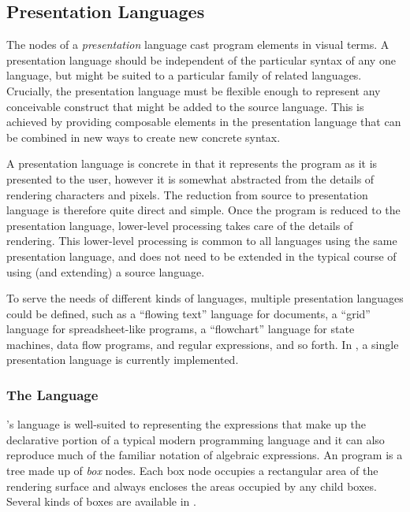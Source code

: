 %
%

\subsection{Presentation Languages}
The nodes of a \emph{presentation} language cast program elements in visual terms. A presentation language should be independent of the particular syntax of any one language, but might be suited to a particular family of related languages. Crucially, the presentation language must be flexible enough to represent any conceivable construct that might be added to the source language. This is achieved by providing composable elements in the presentation language that can be combined in new ways to create new concrete syntax.

A presentation language is concrete in that it represents the program as it is presented to the user, however it is somewhat abstracted from the details of rendering characters and pixels. The reduction from source to presentation language is therefore quite direct and simple. Once the program is reduced to the presentation language, lower-level processing takes care of the details of rendering. This lower-level processing is common to all languages using the same presentation language, and does not need to be extended in the typical course of using (and extending) a source language.

To serve the needs of different kinds of languages, multiple presentation languages could be defined, such as a ``flowing text'' language for documents, a ``grid'' language for spreadsheet-like programs, a ``flowchart'' language for state machines, data flow programs, and regular expressions, and so forth. In \Meta, a single presentation language is currently implemented.

\subsubsection{The  Language}


\Meta's  language is well-suited to representing the expressions that make up the declarative portion of a typical modern programming language and it can also reproduce much of the familiar notation of algebraic expressions. An  program is a tree made up of \emph{box} nodes. Each box node occupies a rectangular area of the rendering surface and always encloses the areas occupied by any child boxes. Several kinds of boxes are available in .

